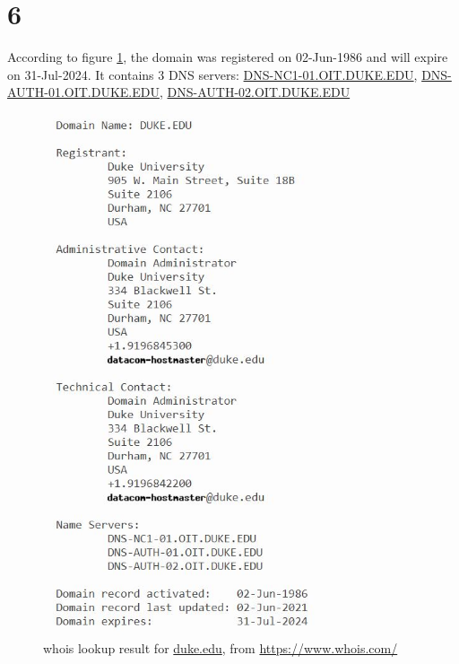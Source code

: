 \documentclass{report}
\begin{document}
  \section*{6}
    According to figure \ref{fig:question6}, the domain was registered on 02-Jun-1986
    and will expire on 31-Jul-2024. It contains $3$ DNS servers: 
    \url{DNS-NC1-01.OIT.DUKE.EDU}, \url{DNS-AUTH-01.OIT.DUKE.EDU}, \url{DNS-AUTH-02.OIT.DUKE.EDU}
    \begin{figure}[ht]
      \centering
      \includegraphics[width=0.9\textwidth]{images/question6.JPG}
      \caption{whois lookup result for \url{duke.edu}, from \url{https://www.whois.com/}}
      \label{fig:question6}
    \end{figure}
    
\end{document}
